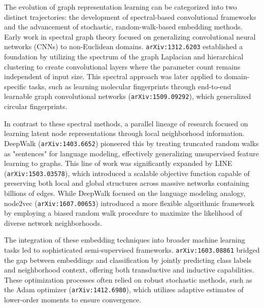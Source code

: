 \documentclass[11pt]{article}
\begin{document}
The evolution of graph representation learning can be categorized into two distinct trajectories: the development of spectral-based convolutional frameworks and the advancement of stochastic, random-walk-based embedding methods. Early work in spectral graph theory focused on generalizing convolutional neural networks (CNNs) to non-Euclidean domains. \texttt{arXiv:1312.6203} established a foundation by utilizing the spectrum of the graph Laplacian and hierarchical clustering to create convolutional layers where the parameter count remains independent of input size. This spectral approach was later applied to domain-specific tasks, such as learning molecular fingerprints through end-to-end learnable graph convolutional networks (\texttt{arXiv:1509.09292}), which generalized circular fingerprints.

In contrast to these spectral methods, a parallel lineage of research focused on learning latent node representations through local neighborhood information. DeepWalk (\texttt{arXiv:1403.6652}) pioneered this by treating truncated random walks as "sentences" for language modeling, effectively generalizing unsupervised feature learning to graphs. This line of work was significantly expanded by LINE (\texttt{arXiv:1503.03578}), which introduced a scalable objective function capable of preserving both local and global structures across massive networks containing billions of edges. While DeepWalk focused on the language modeling analogy, node2vec (\texttt{arXiv:1607.00653}) introduced a more flexible algorithmic framework by employing a biased random walk procedure to maximize the likelihood of diverse network neighborhoods.

The integration of these embedding techniques into broader machine learning tasks led to sophisticated semi-supervised frameworks. \texttt{arXiv:1603.08861} bridged the gap between embeddings and classification by jointly predicting class labels and neighborhood context, offering both transductive and inductive capabilities. These optimization processes often relied on robust stochastic methods, such as the Adam optimizer (\texttt{arXiv:1412.6980}), which utilizes adaptive estimates of lower-order moments to ensure convergence.
\end{document}
